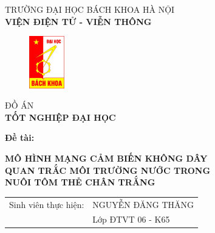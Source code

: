 \begin{titlepage}
\begin{center}
\vspace{-12pt}  TRƯỜNG ĐẠI HỌC BÁCH KHOA HÀ NỘI \\
\textbf{\fontsize{16pt}{0pt}\selectfont VIỆN ĐIỆN TỬ - VIỄN THÔNG}
\vspace{0.5cm}
 \begin{figure}[H]
     \centering
     \includegraphics[width=1.53cm,height=2.26cm]{Images/hust.png}
 \end{figure}
\vspace{1.5cm}
\fontsize{24pt}{0pt}\selectfont ĐỒ ÁN\\
\vspace{12pt}
\textbf{\fontsize{32pt}{0pt}\selectfont TỐT NGHIỆP ĐẠI HỌC}
\vspace{1.5cm}
\end{center}
\hspace{6pt}\textbf{\fontsize{14pt}{0pt}\selectfont Đề tài:}
\begin{center}
    \textbf{\fontsize{20pt}{0pt}\selectfont MÔ HÌNH MẠNG CẢM BIẾN KHÔNG DÂY}\\
    \textbf{\fontsize{20pt}{0pt}\selectfont QUAN TRẮC MÔI TRƯỜNG NƯỚC TRONG  } \\
    \textbf{\fontsize{20pt}{0pt}\selectfont NUÔI TÔM THẺ CHÂN TRẮNG}
\vspace{0.5cm}
\begin{table}[H]
    \centering
    \begin{tabular}{l l}
 \fontsize{14pt}{0pt}\selectfont Sinh viên thực hiện:    & \fontsize{14pt}{0pt}\selectfont NGUYỄN ĐĂNG THĂNG \vspace{6pt} \\ 
     &\fontsize{14pt}{0pt}\selectfont Lớp ĐTVT 06 - K65 \vspace{6pt}\\

\end{tabular}
\end{table}
\end{center}
\end{titlepage}

